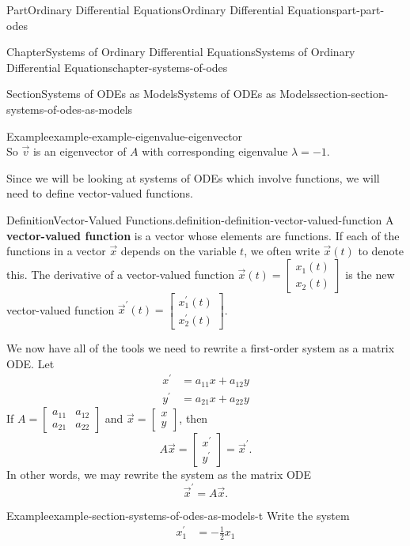 \documentclass[twoside,10pt,]{book}
\newcommand{\terminology}[1]{\textbf{#1}}
\numberwithin{equation}{part}
\begin{document}
\begin{partptx}{Part}{Ordinary Differential Equations}{}{Ordinary Differential Equations}{}{}{part-part-odes}
\begin{chapterptx}{Chapter}{Systems of Ordinary Differential Equations}{}{Systems of Ordinary Differential Equations}{}{}{chapter-systems-of-odes}
\begin{sectionptx}{Section}{Systems of ODEs as Models}{}{Systems of ODEs as Models}{}{}{section-section-systems-of-odes-as-models}
\begin{example}{Example}{}{example-example-eigenvalue-eigenvector}
\begin{equation*}
\end{equation*}
So \(\vec{v}\) is an eigenvector of \(A\) with corresponding eigenvalue \(\lambda=-1\).%
\end{example}
Since we will be looking at systems of ODEs which involve functions, we will need to define vector-valued functions.%
\begin{definition}{Definition}{Vector-Valued Functions.}{definition-definition-vector-valued-function}%
A \terminology{vector-valued function} is a vector whose elements are functions. If each of the functions in a vector \(\vec{x}\) depends on the variable \(t\), we often write \(\vec{x}(t)\) to denote this. The derivative of a vector-valued function \(\vec{x}(t) = \begin{bmatrix}x_{1}(t)\\x_{2}(t)\end{bmatrix}\) is the new vector-valued function \(\vec{x}^\prime(t)=\begin{bmatrix}x^\prime_{1}(t)\\x^\prime_{2}(t)\end{bmatrix}\).%
\end{definition}
We now have all of the tools we need to rewrite a first-order system as a matrix ODE. Let%
\begin{align*}
x^\prime &= a_{11}x+a_{12}y\\
y^\prime &= a_{21}x+a_{22}y
\end{align*}
If \(A = \begin{bmatrix}a_{11}& a_{12} \\ a_{21}& a_{22}\end{bmatrix}\) and \(\vec{x} = \begin{bmatrix}x\\y\end{bmatrix}\), then%
\begin{equation*}
A\vec{x} = \begin{bmatrix}x^\prime\\y^\prime\end{bmatrix} = \vec{x}^\prime.
\end{equation*}
In other words, we may rewrite the system as the matrix ODE%
\begin{equation*}
\vec{x}^\prime =A\vec{x}.
\end{equation*}
%
\begin{example}{Example}{}{example-section-systems-of-odes-as-models-t}%
Write the system%
\begin{align*}
x^\prime_{1}  & = -\frac{1}{2}x_{1}\\

\end{align*}
\end{example}
\end{sectionptx}
\end{chapterptx}
\end{partptx}
\end{document}
